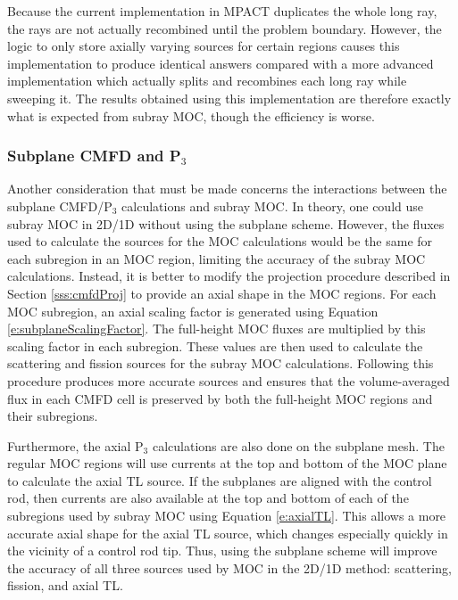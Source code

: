 Because the current implementation in MPACT duplicates the whole long ray, the rays are not actually recombined until the problem boundary.  However, the logic to only store axially varying sources for certain regions causes this implementation to produce identical answers compared with a more advanced implementation which actually splits and recombines each long ray while sweeping it.  The results obtained using this implementation are therefore exactly what is expected from subray MOC, though the efficiency is worse.

\subsubsection{Subplane CMFD and \texorpdfstring{P$_3$}{P3}}

Another consideration that must be made concerns the interactions between the subplane CMFD/P$_3$ calculations and subray MOC.  In theory, one could use subray MOC in 2D/1D without using the subplane scheme.  However, the fluxes used to calculate the sources for the MOC calculations would be the same for each subregion in an MOC region, limiting the accuracy of the subray MOC calculations.  Instead, it is better to modify the projection procedure described in Section \ref{sss:cmfdProj} to provide an axial shape in the MOC regions.  For each MOC subregion, an axial scaling factor is generated using Equation \ref{e:subplaneScalingFactor}.  The full-height MOC fluxes are multiplied by this scaling factor in each subregion.  These values are then used to calculate the scattering and fission sources for the subray MOC calculations.  Following this procedure produces more accurate sources and ensures that the volume-averaged flux in each CMFD cell is preserved by both the full-height MOC regions and their subregions.

Furthermore, the axial P$_3$ calculations are also done on the subplane mesh.  The regular MOC regions will use currents at the top and bottom of the MOC plane to calculate the axial TL source.  If the subplanes are aligned with the control rod, then currents are also available at the top and bottom of each of the subregions used by subray MOC using Equation \ref{e:axialTL}.  This allows a more accurate axial shape for the axial TL source, which changes especially quickly in the vicinity of a control rod tip.  Thus, using the subplane scheme will improve the accuracy of all three sources used by MOC in the 2D/1D method: scattering, fission, and axial TL.

